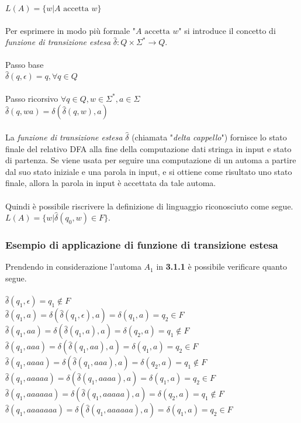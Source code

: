 \documentclass[]{article}
\begin{document}
\mbox{$L(A) = \{ w | A \text{ accetta } w \}$}
\\
\\
Per esprimere in modo più formale "\mbox{$A \text{ accetta } w$}" si introduce il concetto di
\textit{funzione di transizione estesa} \mbox{$\hat\delta \colon Q \times \Sigma^* \to Q$}.
\\
\\
Passo base
\\
\mbox{$\hat\delta(q, \epsilon) = q, \forall q \in Q$}
\\
\\
Passo ricorsivo \mbox{$\forall q \in Q, w \in \Sigma^*, a \in \Sigma$}
\\
\mbox{$\hat\delta(q, wa) = \delta(\hat\delta(q, w), a)$}
\\
\\
La \textit{funzione di transizione estesa} \mbox{$\hat\delta$} (chiamata "\textit{delta cappello}") fornisce
lo stato finale del relativo DFA alla fine della computazione dati stringa in input e stato di partenza.
Se viene usata per seguire una computazione di un automa a partire dal suo stato iniziale e una parola in
input, e si ottiene come risultato uno stato finale, allora la parola in input è accettata da tale automa.
\\
\\
Quindi è possibile riscrivere la definizione di linguaggio riconosciuto come segue.
\\
\mbox{$L(A) = \{ w | \hat\delta(q_0, w) \in F \}$}.



\subsubsection{Esempio di applicazione di funzione di transizione estesa}
Prendendo in considerazione l'automa \mbox{$A_1$} in \textbf{3.1.1} è possibile verificare quanto segue.
\\
\\
\mbox{$ \hat\delta(q_1, \epsilon) = q_1 \not\in F $}
\\
\mbox{$ \hat\delta(q_1, a) = \delta( \hat\delta(q_1, \epsilon) , a) = \delta( q_1 , a) = q_2 \in F $}
\\
\mbox{$ \hat\delta(q_1, aa) = \delta( \hat\delta(q_1, a) , a) = \delta( q_2 , a) = q_1 \not\in F $}
\\
\mbox{$ \hat\delta(q_1, aaa) = \delta( \hat\delta(q_1, aa) , a) = \delta( q_1 , a) = q_2 \in F $}
\\
\mbox{$ \hat\delta(q_1, aaaa) = \delta( \hat\delta(q_1, aaa) , a) = \delta( q_2 , a) = q_1 \not\in F $}
\\
\mbox{$ \hat\delta(q_1, aaaaa) = \delta( \hat\delta(q_1, aaaa) , a) = \delta( q_1 , a) = q_2 \in F $}
\\
\mbox{$ \hat\delta(q_1, aaaaaa) = \delta( \hat\delta(q_1, aaaaa) , a) = \delta( q_2 , a) = q_1 \not\in F $}
\\
\mbox{$ \hat\delta(q_1, aaaaaaa) = \delta( \hat\delta(q_1, aaaaaa) , a) = \delta( q_1 , a) = q_2 \in F $}
\end{document}
